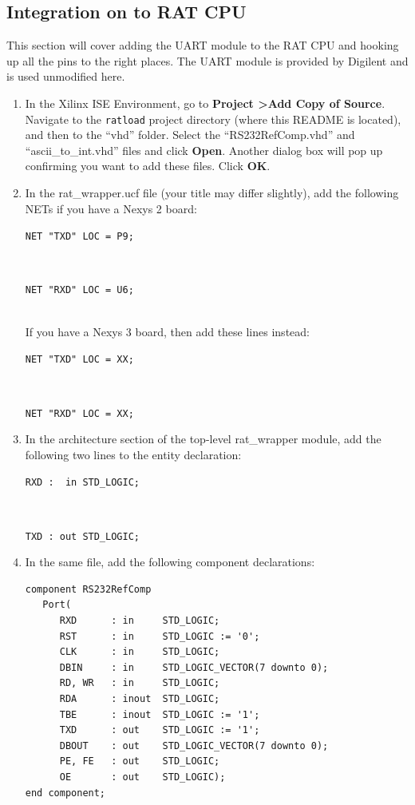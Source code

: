 \documentclass[notitlepage]{article}
\begin{document}
\subsection{Integration on to RAT CPU}
This section will cover adding the UART module to the RAT CPU and hooking up all the pins to the right places. The UART module is provided by Digilent and is used unmodified here.
\begin {enumerate}
\item In the Xilinx ISE Environment, go to \textbf{Project \textgreater Add Copy of Source}. Navigate to the \texttt{ratload} project directory (where this README is located), and then to the ``vhd'' folder. Select the ``RS232RefComp.vhd'' and ``ascii\_to\_int.vhd'' files and click \textbf{Open}. Another dialog box will pop up confirming you want to add these files. Click \textbf{OK}.

\item In the rat\_wrapper.ucf file (your title may differ slightly), add the following NETs if you have a Nexys 2 board:\\
\centerline{\texttt{NET "TXD" LOC = P9;}}\\
\centerline{\texttt{NET "RXD" LOC = U6;}}\\
If you have a Nexys 3 board, then add these lines instead:\\
\centerline{\texttt{NET "TXD" LOC = XX;}}\\
\centerline{\texttt{NET "RXD" LOC = XX;}}

\item In the architecture section of the top-level rat\_wrapper module, add the following two lines to the entity declaration:\\
\centerline{\texttt{RXD : ~in STD\_LOGIC;}}\\
\centerline{\texttt{TXD : out STD\_LOGIC;}}

\item In the same file, add the following component declarations:
\begin{verbatim}
component RS232RefComp
   Port(
      RXD      : in     STD_LOGIC;
      RST      : in     STD_LOGIC := '0';
      CLK      : in     STD_LOGIC;
      DBIN     : in     STD_LOGIC_VECTOR(7 downto 0);
      RD, WR   : in     STD_LOGIC;
      RDA      : inout  STD_LOGIC;
      TBE      : inout  STD_LOGIC := '1';
      TXD      : out    STD_LOGIC := '1';
      DBOUT    : out    STD_LOGIC_VECTOR(7 downto 0);
      PE, FE   : out    STD_LOGIC;
      OE       : out    STD_LOGIC);
end component;


\end{verbatim}
\end{enumerate}
\end{document}

